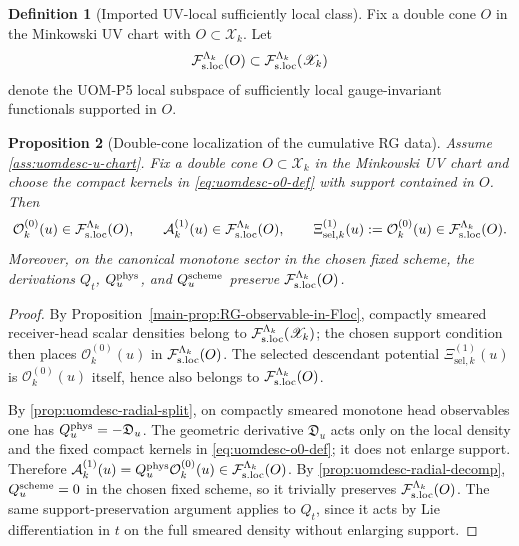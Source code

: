 \documentclass[11pt]{article}
\theoremstyle{definition}
\newtheorem{definition}{Definition}[section]
\theoremstyle{plain}
\newtheorem{proposition}[definition]{Proposition}
\theoremstyle{remark}
\newcommand{\Fsloc}{\mathcal F_{\rm s.loc}}
\newcommand{\Xscr}{\mathscr X}
\newcommand{\Ozero}{\mathcal O^{(0)}}
\newcommand{\Aone}{\mathcal A^{(1)}}
\newcommand{\Xiselk}{\Xi^{(1)}_{\mathrm{sel},k}}
\newcommand{\Qt}{Q_t}
\newcommand{\Du}{\mathfrak D_u}
\newcommand{\Quphys}{Q_u^{\rm phys}}
\newcommand{\Quscheme}{Q_u^{\rm scheme}}
\begin{document}
\begin{definition}[Imported UV-local sufficiently local class]
\label{def:uomdesc-local-O}
Fix a double cone \(O\) in the Minkowski UV chart with \(O\subset\Xscr_k\).
Let
\[
\Fsloc^{\Lambda_k}(O)\subset \Fsloc^{\Lambda_k}(\Xscr_k)
\]
denote the UOM-P5 local subspace of sufficiently local gauge-invariant functionals
supported in \(O\).
\end{definition}

\begin{proposition}[Double-cone localization of the cumulative RG data]
\label{prop:uomdesc-2trg-local}
Assume \cref{ass:uomdesc-u-chart}.
Fix a double cone \(O\subset\Xscr_k\) in the Minkowski UV chart and choose the compact kernels in
\eqref{eq:uomdesc-o0-def} with support contained in \(O\).
Then
\[
\Ozero_k(u)\in \Fsloc^{\Lambda_k}(O),
\qquad
\Aone_k(u)\in \Fsloc^{\Lambda_k}(O),
\qquad
\Xiselk(u):=\Ozero_k(u)\in \Fsloc^{\Lambda_k}(O).
\]
Moreover, on the canonical monotone sector in the chosen fixed scheme, the derivations
\(\Qt\), \(\Quphys\), and \(\Quscheme\) preserve \(\Fsloc^{\Lambda_k}(O)\).
\end{proposition}

\begin{proof}
By Proposition~\ref{main-prop:RG-observable-in-Floc}, compactly smeared receiver-head scalar
densities belong
to \(\Fsloc^{\Lambda_k}(\Xscr_k)\); the chosen support condition then places
\(\Ozero_k(u)\) in \(\Fsloc^{\Lambda_k}(O)\).
The selected descendant potential \(\Xiselk(u)\) is \(\Ozero_k(u)\) itself, hence
also belongs to \(\Fsloc^{\Lambda_k}(O)\).

By \cref{prop:uomdesc-radial-split}, on compactly smeared monotone head observables one has
\(
\Quphys=-\Du
\).
The geometric derivative \(\Du\) acts only on the local density and the fixed compact kernels in
\eqref{eq:uomdesc-o0-def}; it does not enlarge support.
Therefore
\(
\Aone_k(u)=\Quphys\Ozero_k(u)\in \Fsloc^{\Lambda_k}(O)
\).
By \cref{prop:uomdesc-radial-decomp}, \(\Quscheme=0\) in the chosen fixed scheme, so it trivially
preserves \(\Fsloc^{\Lambda_k}(O)\).
The same support-preservation argument applies to \(\Qt\), since it acts by Lie differentiation in
\(t\) on the full smeared density without enlarging support.
\end{proof}
\end{document}
